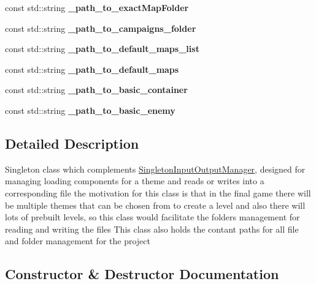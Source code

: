 \begin{DoxyCompactItemize}
const std\+::string {\bfseries \+\_\+path\+\_\+to\+\_\+exact\+Map\+Folder}
\item 
\hypertarget{class_singleton_file_path_and_folder_manager_ae8521d09d8d48441ce5fc0d9dd8ba687}{}\label{class_singleton_file_path_and_folder_manager_ae8521d09d8d48441ce5fc0d9dd8ba687} 
const std\+::string {\bfseries \+\_\+path\+\_\+to\+\_\+campaigns\+\_\+folder}
\item 
\hypertarget{class_singleton_file_path_and_folder_manager_a16b7fa41c7a1767324358123c64a9eda}{}\label{class_singleton_file_path_and_folder_manager_a16b7fa41c7a1767324358123c64a9eda} 
const std\+::string {\bfseries \+\_\+path\+\_\+to\+\_\+default\+\_\+maps\+\_\+list}
\item 
\hypertarget{class_singleton_file_path_and_folder_manager_af87a2c143b6bbeb3048bec5a6c68937e}{}\label{class_singleton_file_path_and_folder_manager_af87a2c143b6bbeb3048bec5a6c68937e} 
const std\+::string {\bfseries \+\_\+path\+\_\+to\+\_\+default\+\_\+maps}
\item 
\hypertarget{class_singleton_file_path_and_folder_manager_ad67679ed78a376d784f9306c025672ef}{}\label{class_singleton_file_path_and_folder_manager_ad67679ed78a376d784f9306c025672ef} 
const std\+::string {\bfseries \+\_\+path\+\_\+to\+\_\+basic\+\_\+container}
\item 
\hypertarget{class_singleton_file_path_and_folder_manager_afe5c015ffbd04d0e9510cf0003c208e1}{}\label{class_singleton_file_path_and_folder_manager_afe5c015ffbd04d0e9510cf0003c208e1} 
const std\+::string {\bfseries \+\_\+path\+\_\+to\+\_\+basic\+\_\+enemy}
\end{DoxyCompactItemize}


\subsection{Detailed Description}
Singleton class which complements \hyperlink{class_singleton_input_output_manager}{Singleton\+Input\+Output\+Manager}, designed for managing loading components for a theme and reads or writes into a corresponding file the motivation for this class is that in the final game there will be multiple themes that can be chosen from to create a level and also there will lots of prebuilt levels, so this class would facilitate the folders management for reading and writing the files This class also holds the contant paths for all file and folder management for the project 

\subsection{Constructor \& Destructor Documentation}
\hypertarget{class_singleton_file_path_and_folder_manager_a598800592aee8d9e19465261714c2f28}{}\label{class_singleton_file_path_and_folder_manager_a598800592aee8d9e19465261714c2f28} 
